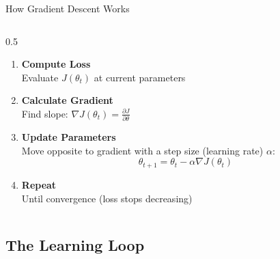 \begin{frame}{How Gradient Descent Works}
\begin{columns}[c]
\begin{column}{0.5\textwidth}
            \begin{enumerate}
                \item \textbf{Compute Loss}\\
                {\small Evaluate $J(\theta_t)$ at current parameters}
                
                \vspace{0.3em}
                
                \item \textbf{Calculate Gradient}\\
                {\small Find slope: $\nabla J(\theta_t) = \frac{\partial J}{\partial \theta}$}
                
                \vspace{0.3em}
                
                \item \textbf{Update Parameters}\\
                {\small Move opposite to gradient with a step size (learning rate) $\alpha$:}
                $$\theta_{t+1} = \theta_t - \alpha \nabla J(\theta_t)$$
                
                
                \item \textbf{Repeat}\\
                {\small Until convergence (loss stops decreasing)}
            \end{enumerate}

        \end{column}
    \end{columns}
    
\end{frame}


\subsection{The Learning Loop}

